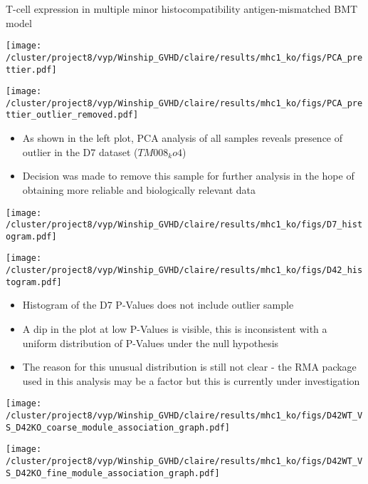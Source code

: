 \documentclass[final,hyperref={pdfpagelabels=false}]{beamer}
\begin{document}
\begin{frame}{}
\begin{columns}[t]
\begin{column}{.24\linewidth}
\begin{block}{T-cell expression in multiple minor histocompatibility antigen-mismatched BMT model}
	  \begin{minipage}{0.45\textwidth}
	    \texttt{[image: /cluster/project8/vyp/Winship\_GVHD/claire/results/mhc1\_ko/figs/PCA\_prettier.pdf]}
	  \end{minipage}	  
	  \begin{minipage}{0.45\textwidth}
	    \texttt{[image: /cluster/project8/vyp/Winship\_GVHD/claire/results/mhc1\_ko/figs/PCA\_prettier\_outlier\_removed.pdf]}
	  \end{minipage}	  
	  {\small
          \begin{itemize}
          \item As shown in the left plot, PCA analysis of all samples reveals presence of outlier in the D7 dataset ($TM008_ko4$)
          \item Decision was made to remove this sample for further analysis in the hope of obtaining more reliable and biologically relevant data
          \end{itemize} }
	  \begin{minipage}{0.45\textwidth}
            \texttt{[image: /cluster/project8/vyp/Winship\_GVHD/claire/results/mhc1\_ko/figs/D7\_histogram.pdf]}
          \end{minipage}
	  \begin{minipage}{0.45\textwidth}
            \texttt{[image: /cluster/project8/vyp/Winship\_GVHD/claire/results/mhc1\_ko/figs/D42\_histogram.pdf]}
	    \end{minipage}
{\small	  \begin{itemize}
	    \item Histogram of the D7 P-Values does not include outlier sample
	    \item A dip in the plot at low P-Values is visible, this is inconsistent with a uniform distribution of P-Values under the null hypothesis
	    \item The reason for this unusual distribution is still not clear - the RMA package used in this analysis may be a factor but this is currently under investigation 
	\end{itemize}} 
          \begin{minipage}{0.45\textwidth}
            \texttt{[image: /cluster/project8/vyp/Winship\_GVHD/claire/results/mhc1\_ko/figs/D42WT\_VS\_D42KO\_coarse\_module\_association\_graph.pdf]}
          \end{minipage}
          \begin{minipage}{0.45\textwidth}
            \texttt{[image: /cluster/project8/vyp/Winship\_GVHD/claire/results/mhc1\_ko/figs/D42WT\_VS\_D42KO\_fine\_module\_association\_graph.pdf]}

\end{minipage}
\end{block}
\end{column}
\end{columns}
\end{frame}
\end{document}
